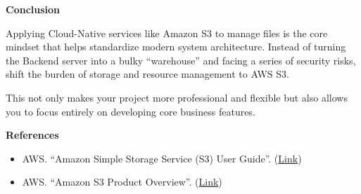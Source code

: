 \vspace{0.5em}\noindent\textbf{Conclusion}

Applying Cloud-Native services like Amazon S3 to manage files is the
core mindset that helps standardize modern system architecture. Instead
of turning the Backend server into a bulky ``warehouse'' and facing a
series of security risks, shift the burden of storage and resource
management to AWS S3.

This not only makes your project more professional and flexible but also
allows you to focus entirely on developing core business features.

\vspace{0.5em}\noindent\textbf{References}

\begin{itemize}
\tightlist
\item
  AWS. ``Amazon Simple Storage Service (S3) User Guide''.
  (\href{https://docs.aws.amazon.com/AmazonS3/latest/userguide/}{Link})
\item
  AWS. ``Amazon S3 Product Overview''.
  (\href{https://aws.amazon.com/s3/}{Link})
\end{itemize}
